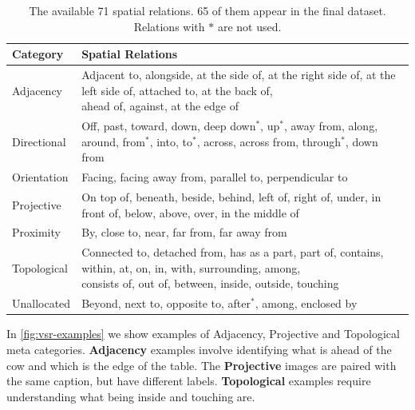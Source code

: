 \begin{table}[ht]
    \centering
    \begin{adjustbox}{max width=\textwidth}
    \begin{tabular}{l|l}
    \toprule
        \rowcolor{DarkGray}
    Category & Spatial Relations \\
    \midrule
    Adjacency   & \makecell[l]{Adjacent to, alongside, at the side of, at the right side of, at the left side of, attached to, at the back of,\\ ahead of, against, at the edge of} \\
    \rowcolor{Gray}
 Directional & \makecell[l]{Off, past, toward, down, deep down$^\ast$, up$^\ast$, away from, along, around, from$^\ast$, into, to$^\ast$, across, across from, \\through$^\ast$, down from }\\
    Orientation & Facing, facing away from, parallel to, perpendicular to\\
    \rowcolor{Gray}
    Projective & On top of, beneath, beside, behind, left of, right of, under, in front of, below, above, over, in the middle of\\
    Proximity & By, close to, near, far from, far away from \\
        \rowcolor{Gray}
    Topological & \makecell[l]{Connected to, detached from, has as a part, part of, contains, within, at, on, in, with, surrounding, among, \\ consists of, out of, between, inside, outside, touching}\\
    Unallocated & Beyond, next to, opposite to, after$^\ast$, among, enclosed by \\
\bottomrule
    \end{tabular}
    \end{adjustbox}
    \caption{The available 71 spatial relations. 65 of them appear in the final dataset. Relations with $\ast$ are not used.}
    \label{tab:spatial_relations}
\end{table}

In \cref{fig:vsr-examples} we show examples of Adjacency, Projective and Topological meta categories. \textbf{Adjacency} examples involve identifying what is ahead of the cow and which is the edge of the table. The \textbf{Projective} images are paired with the same caption, but have different labels. \textbf{Topological} examples require understanding what being inside and touching are.

